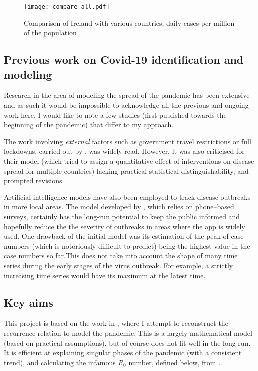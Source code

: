 \begin{figure}[H]
\texttt{[image: compare-all.pdf]}
\endminipage
\caption{Comparison of Ireland with various countries, daily cases per million of the population}
\end{figure}




\subsection{Previous work on Covid-19 identification and modeling}
Research in the area of modeling the spread of the pandemic has been extensive and as such it would be impossible to acknowledge all the previous and ongoing work here. I would like to note a few studies (first published towards the beginning of the pandemic) that differ to my approach.

The work involving \textit{external} factors such as government travel restrictions or full lockdowns, carried out by \cite{flaxman20}, was widely read. However, it was also criticised for their model (which tried to assign a quantitative effect of interventions on disease spread for multiple countries) lacking practical statistical distinguishability, and prompted revisions.

Artificial intelligence models have also been employed to track disease outbreaks in more local areas. The model developed by \cite{SrinivasaRao2020}, which relies on phone–based surveys, certainly has the long-run potential to keep the public informed and hopefully reduce the the severity of outbreaks in areas where the app is widely used. One drawback of the initial model was its estimation of the peak of case numbers (which is notoriously difficult to predict) being the highest value in the case numbers so far.This does not take into account the shape of many time series during the early stages of the virus outbreak. For example, a strictly increasing time series would have its maximum at the latest time.


\subsection{Key aims}

This project is based on the work in \cite{grigor20}, where I attempt to reconstruct the recurrence relation to model the pandemic. This is a largely mathematical model (based on practical assumptions), but of course does not fit well in the long run. It is efficient at explaining singular phases of the pandemic (with a consistent trend), and calculating the infamous $R_0$ number, defined below, from \cite{epid08}. 

